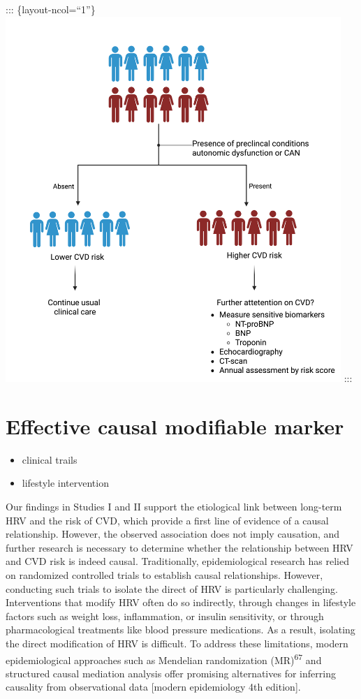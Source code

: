 \documentclass[
  a4paper,
  headsepline=true,
  open=any]{scrbook}
\providecommand{\tightlist}{%
  \setlength{\itemsep}{0pt}\setlength{\parskip}{0pt}}\usepackage{longtable,booktabs,array}
\begin{document}
::: \{layout-ncol=``1''\}
\includegraphics[width=5in,height=\textheight]{images/strafication_tree_of_CAN.png}
:::

\hypertarget{effective-causal-modifiable-marker}{%
\section{Effective causal modifiable
marker}\label{effective-causal-modifiable-marker}}

\begin{itemize}
\tightlist
\item
  clinical trails
\item
  lifestyle intervention
\end{itemize}

Our findings in Studies I and II support the etiological link between
long-term HRV and the risk of CVD, which provide a first line of
evidence of a causal relationship. However, the observed association
does not imply causation, and further research is necessary to determine
whether the relationship between HRV and CVD risk is indeed causal.
Traditionally, epidemiological research has relied on randomized
controlled trials to establish causal relationships. However, conducting
such trials to isolate the direct of HRV is particularly challenging.
Interventions that modify HRV often do so indirectly, through changes in
lifestyle factors such as weight loss, inflammation, or insulin
sensitivity, or through pharmacological treatments like blood pressure
medications. As a result, isolating the direct modification of HRV is
difficult. To address these limitations, modern epidemiological
approaches such as Mendelian randomization (MR)\textsuperscript{67} and
structured causal mediation analysis offer promising alternatives for
inferring causality from observational data {[}modern epidemiology 4th
edition{]}.
\end{document}
